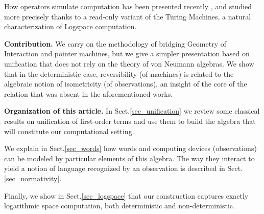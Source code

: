 How operators simulate computation has been presented recently \cite{girard_normativity_2012}, and studied more precisely \cite{aubert_characterizing_2012,seiller_logarithmic_2013} thanks to a read-only variant of the Turing Machines, a natural characterization of {\sc Logspace} computation.



\medskip

\bigskip\noindent
\textbf{Contribution.} We carry on the methodology of bridging Geometry of Interaction and pointer machines, but we give a simpler presentation based on unification that does not rely on the theory of von Neumann algebras.
We show that in the deterministic case, reversibility (of machines) is related to the algebraic notion of isometricity (of observations), an insight of the core of the relation that was absent in the aforementioned works.


\medskip\noindent
\textbf{Organization of this article.} In Sect.\ref{sec_unification} we review some classical results on unification of first-order terms and use them to build the algebra that will constitute our computational setting.

We explain in Sect.\ref{sec_words} how words and computing devices (observations) can be modeled by particular elements of this algebra.
The way they interact to yield a notion of language recognized by an observation is described in Sect.\ref{sec_normativity}.

Finally, we show in Sect.\ref{sec_logspace} that our construction captures exactly logarithmic space computation, both deterministic and non-deterministic.
